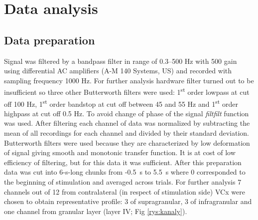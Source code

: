 \documentclass{pracalicmgr}
\begin{document}
   \chapter{Data analysis}
   
   \section{Data preparation}
   \label{sec:data_prep}
   Signal was filtered by a bandpass filter in range of 0.3--500 Hz with 500 gain using differential AC amplifiers (A-M 140 Systems, US) and recorded with sampling frequency 1000 Hz. For further analysis hardware filter turned out to be insufficient so three other Butterworth filters were used: 1\textsuperscript{st} order lowpass at cut off 100 Hz,  1\textsuperscript{st} order bandstop at cut off between 45 and 55 Hz and  1\textsuperscript{st} order highpass at cut off 0.5 Hz. To avoid change of phase of the signal \textit{filtfilt} function was used. After filtering each channel of data was normalized by subtracting the mean of all recordings for each channel and divided by their standard deviation. Butterworth filters were used because they are characterized by low deformation of signal giving smooth and monotonic transfer function. It is at cost of low efficiency of filtering, but for this data it was sufficient. After this preparation data was cut into 6-s-long chunks from -0.5~s to 5.5~s where 0 corresponded to the beginning of stimulation and averaged across trials. For further analysis 7 channels out of 12 from contralateral (in respect of stimulation side) VCx were chosen to obtain representative profile: 3 of supragranular, 3 of infragranular and one channel from granular layer (layer IV; Fig \ref{rys:kanaly}).
   
\end{document}
